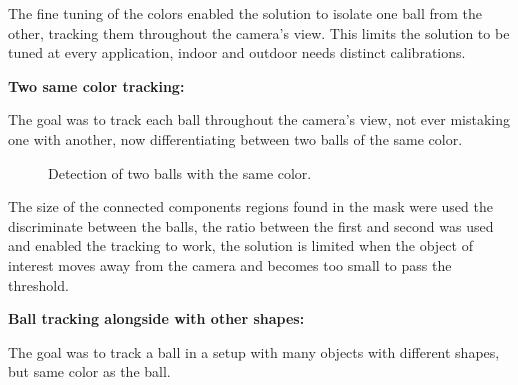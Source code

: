 \documentclass[10pt,twocolumn,letterpaper]{article}
\begin{document}
  The fine tuning of the colors enabled the solution to isolate one ball from
  the other, tracking them throughout the camera's view. This limits the
  solution to be tuned at every application, indoor  and outdoor needs
  distinct calibrations.

  \bigbreak{}
  \textbf{Two same color tracking:}
  \bigbreak{}

  The goal was to track each ball throughout the camera's view, not ever
  mistaking one with another, now differentiating between two balls of the same
  color.

  \begin{figure}[!h]
    \centering
    \setlength{\fboxsep}{1pt}
    \setlength{\fboxrule}{1pt}
    \caption{Detection of two balls with the same color.}\label{fig:same_color}
  \end{figure}

  The size of the connected components regions found in the mask were used the
  discriminate between the balls, the ratio between the first and second was
  used and enabled the tracking to work, the solution is limited when the object
  of interest moves away from the camera and becomes too small to pass the
  threshold.

  \bigbreak{}
  \textbf{Ball tracking alongside with other shapes:}
  \bigbreak{}

  The goal was to track a ball in a setup with many objects with different
  shapes, but same color as the ball.
\end{document}
